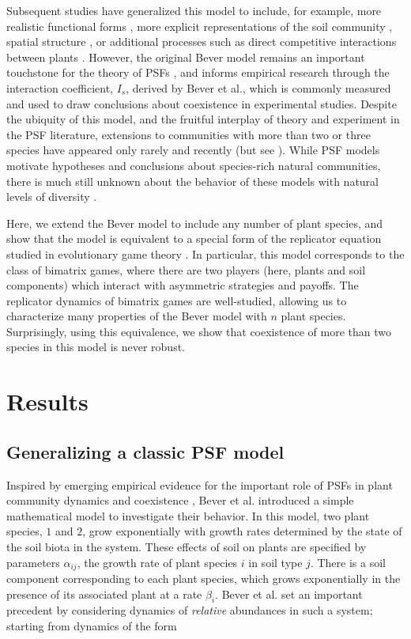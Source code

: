 \documentclass[11pt]{article}
\begin{document}
Subsequent studies have generalized this model to include, for example, more realistic functional forms \citep{umbanhowar2005simple, eppinga2006accumulation}, more explicit representations of the soil community \citep{bever2010rooting}, spatial structure \citep{eppinga2006accumulation,molofsky2002negative,suding2013consequences}, or additional processes such as direct competitive interactions between plants \citep{bever2003soil}. However, the original Bever model remains an important touchstone for the theory of PSFs \citep{ke2015incorporating,ke2020effects}, and informs empirical research through the interaction coefficient, $I_s$, derived by Bever et al., which is commonly measured and used to draw conclusions about coexistence in experimental studies. Despite the ubiquity of this model, and the fruitful interplay of theory and experiment in the PSF literature, extensions to communities with more than two or three species have appeared only rarely and recently (but see \citep{eppinga2018frequency,mack2019plant}). While PSF models motivate hypotheses and conclusions about species-rich natural communities, there is much still unknown about the behavior of these models with natural levels of diversity \citep{van2013plant}.

Here, we extend the Bever model to include any number of plant species, and show that the model is equivalent to a special form of the replicator equation studied in evolutionary game theory \citep{hofbauer1998evolutionary}. In particular, this model corresponds to the class of bimatrix games, where there are two players (here, plants and soil components) which interact with asymmetric strategies and payoffs. The replicator dynamics of bimatrix games are well-studied, allowing us to characterize many properties of the Bever model with $n$ plant species. Surprisingly, using this equivalence, we show that coexistence of more than two species in this model is never robust. 

\section{Results}

\subsection{Generalizing a classic PSF model}

Inspired by emerging empirical evidence for the important role of PSFs in plant community dynamics and coexistence \citep{van1993plant,bever1994feedback}, Bever et al. \citep{bever1997incorporating} introduced a simple mathematical model to investigate their behavior. In this model, two plant species, $1$ and $2$, grow exponentially with growth rates determined by the state of the soil biota in the system. These effects of soil on plants are specified by parameters $\alpha_{ij}$, the growth rate of plant species $i$ in soil type $j$. There is a soil component corresponding to each plant species, which grows exponentially in the presence of its associated plant at a rate $\beta_i$. Bever et al. set an important precedent by considering dynamics of \emph{relative} abundances in such a system; starting from dynamics of the form
\end{document}
